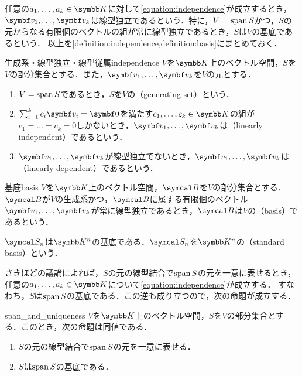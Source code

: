 \documentclass[../../main]{subfiles}
\begin{document}
任意の\(a_1,\dots,a_k\in\numset{K}\)に対して\cref{equation:independence}が成立するとき，
\(\vect{v}_1,\dots,\vect{v}_k\)は線型独立であるという．特に，\(V=\operatorname{span} S\)かつ，\(S\)の元からなる有限個のベクトルの組が常に線型独立であるとき，\(S\)は\(V\)の基底であるという．
以上を\cref{definition:independence,definition:basis}にまとめておく．

\begin{definition}{生成系・線型独立・線型従属}{independence}
  \(V\)を\(\numset{K}\)上のベクトル空間，\(S\)を\(V\)の部分集合とする．また，\(\vect{v}_1,\dots,\vect{v}_k\)を\(V\)の元とする．
  \begin{enumerate}
    \item \(V=\operatorname{span} S\)であるとき，\(S\)を\(V\)の（generating set）という．
    \item \(\sum_{i=1}^kc_i\vect{v}_i=\zvec\)を満たす\(c_1,\dots,c_k\in\numset{K}\)の組が\(c_1=\dots=c_k=0\)しかないとき，\(\vect{v}_1,\dots,\vect{v}_k\)は（linearly independent）であるという．
    \item \(\vect{v}_1,\dots,\vect{v}_k\)が線型独立でないとき，\(\vect{v}_1,\dots,\vect{v}_k\)は（linearly dependent）であるという．
  \end{enumerate}
\end{definition}

\begin{definition}{基底}{basis}
  \(V\)を\(\numset{K}\)上のベクトル空間，\(\basis{B}\)を\(V\)の部分集合とする．
  \(\basis{B}\)が\(V\)の生成系かつ，\(\basis{B}\)に属する有限個のベクトル\(\vect{v}_1,\dots,\vect{v}_k\)が常に線型独立であるとき，\(\basis{B}\)は\(V\)の（basis）であるという．
\end{definition}

\begin{example}[標準基底]
  \(\basis{S}_n\)は\(\numset{K}^n\)の基底である．\(\basis{S}_n\)を\(\numset{K}^n\)の（standard basis）という．
\end{example}

さきほどの議論によれば，\(S\)の元の線型結合で\(\operatorname{span} S\)の元を一意に表せるとき，任意の\(a_1,\dots,a_k\in\numset{K}\)について\cref{equation:independence}が成立する．
すなわち，\(S\)は\(\operatorname{span} S\)の基底である．この逆も成り立つので，次の命題が成立する．

\begin{proposition}{}{span_and_uniqueness}
  \(V\)を\(\numset{K}\)上のベクトル空間，\(S\)を\(V\)の部分集合とする．このとき，次の命題は同値である．
  \begin{enumerate}
    \item \(S\)の元の線型結合で\(\operatorname{span} S\)の元を一意に表せる．
    \item \(S\)は\(\operatorname{span} S\)の基底である．
  \end{enumerate}
\end{proposition}
\end{document}
